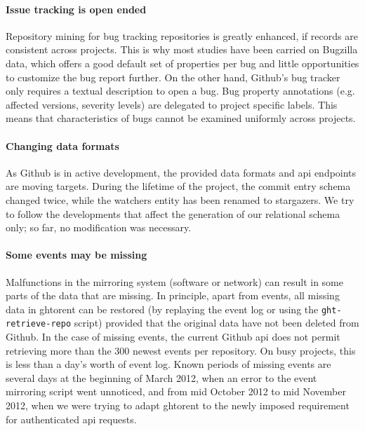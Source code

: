 \documentclass[conference,letter]{IEEEtran}
\begin{document}
\paragraph*{Issue tracking is open ended} Repository mining for bug tracking
    repositories is greatly enhanced, if records are consistent across
    projects. This is why most studies have been carried on Bugzilla data, which
    offers a good default set of properties per bug and little opportunities to
    customize the bug report further. On the other hand, Github's bug tracker
    only requires a textual description to open a bug. Bug property annotations
    (e.g. affected versions, severity levels) are delegated to project specific
    labels. This means that characteristics of bugs cannot be
    examined uniformly across projects.

\paragraph*{Changing data formats} As Github is in active development, the
provided data formats and {\sc api} endpoints are moving targets. During the
lifetime of the project, the commit entry schema changed twice, while the
\textsf{watchers} entity has been renamed to \textsf{stargazers}. We try to
follow the developments that affect the generation of our relational schema
only; so far, no modification was necessary.

\paragraph*{Some events may be missing} Malfunctions in the mirroring system
    (software or network) can result in some parts of the data that are missing.
    In principle, apart from events, all missing data in {\sc ght}orent can be
    restored (by replaying the event log or using the \texttt{ght-retrieve-repo}
    script) provided that the original data have not been deleted from Github.
    In the case of missing events, the current Github {\sc api} does not permit
    retrieving more than the 300 newest events per repository. On busy projects, this
    is less than a day's worth of event log. Known periods of missing events are
    several days at the beginning of March 2012, when an error to the event
    mirroring script went unnoticed, and from mid October 2012 to mid November
    2012, when we were trying to adapt {\sc ght}orent to the newly imposed
    requirement for authenticated {\sc api} requests.
\end{document}

